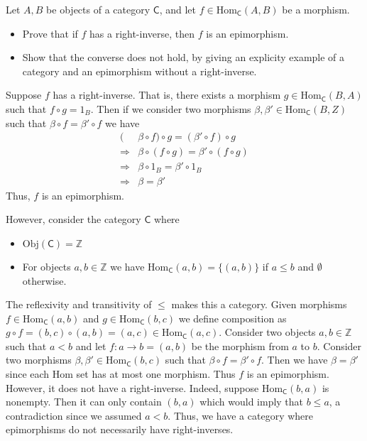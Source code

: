 \documentclass[../../master.tex]{subfiles}
\begin{document}
    \begin{problem}
      Let \(A, B\) be objects of a category \(\mathsf{C}\), and let \(f \in \text{Hom}_{\mathsf{C}}(A, B)\) be a morphism.
      \begin{itemize}
        \item Prove that if \(f\) has a right-inverse, then \(f\) is an epimorphism.
        \item Show that the converse does not hold, by giving an explicity example of a category and an epimorphism without a right-inverse.
      \end{itemize}
    \end{problem}

    \begin{solution}
      Suppose \(f\) has a right-inverse. That is, there exists a morphism \(g \in \text{Hom}_{\mathsf{C}}(B, A)\) such that
      \(f \circ g = 1_{B}\).
      Then if we consider two morphisms \(\beta, \beta' \in \text{Hom}_{\mathsf{C}}(B, Z)\) such that \(\beta \circ f = \beta' \circ f\) we have
      \begin{align*}
        (&\beta \circ f) \circ g = (\beta' \circ f) \circ g \\
        \Longrightarrow &\beta \circ (f \circ g) = \beta' \circ (f \circ g) \\
        \Longrightarrow &\beta \circ 1_{B} = \beta' \circ 1_{B} \\
        \Longrightarrow &\beta = \beta'
      \end{align*}
      Thus, \(f\) is an epimorphism.

      However, consider the category \(\mathsf{C}\) where
      \begin{itemize}
        \item \(\text{Obj}(\mathsf{C}) = \mathbb{Z}\)
        \item For objects \(a, b \in \mathbb{Z}\) we have
        \(\text{Hom}_{\mathsf{C}}(a, b) = \{(a, b)\}\) if \(a \leq b\) and \(\emptyset\) otherwise.
      \end{itemize}
      The reflexivity and transitivity of \(\leq\) makes this a category.
      Given morphisms \(f \in \text{Hom}_{\mathsf{C}}(a, b)\) and \(g \in \text{Hom}_{\mathsf{C}}(b, c)\) we define composition as
      \(g \circ f = (b, c) \circ (a, b) = (a, c) \in \text{Hom}_{\mathsf{C}}(a, c)\).
      Consider two objects \(a, b \in \mathbb{Z}\) such that \(a < b\) and let \(f: a \to b = (a, b)\) be the morphism from \(a\) to \(b\).
      Consider two morphisms \(\beta, \beta' \in \text{Hom}_{\mathsf{C}}(b, c)\) such that \(\beta \circ f = \beta' \circ f\).
      Then we have \(\beta = \beta'\) since each Hom set has at most one morphism.
      Thus \(f\) is an epimorphism. However, it does not have a right-inverse.
      Indeed, suppose \(\text{Hom}_{\mathsf{C}}(b, a)\) is nonempty.
      Then it can only contain \((b, a)\) which would imply that \(b \leq a\), a contradiction since we assumed \(a < b\).
      Thus, we have a category where epimorphisms do not necessarily have right-inverses.
    \end{solution}
\end{document}
